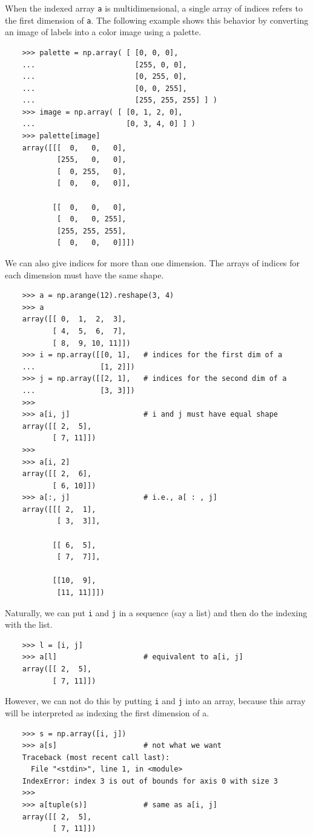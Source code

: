 \documentclass[UTF8]{article}
\begin{document}
When the indexed array \texttt{a} is multidimensional, a single array of indices refers to the
first dimension of \texttt{a}. The following example shows this behavior by converting an image of
labels into a color image using a palette.
\begin{verbatim}
    >>> palette = np.array( [ [0, 0, 0],
    ...                       [255, 0, 0],
    ...                       [0, 255, 0],
    ...                       [0, 0, 255],
    ...                       [255, 255, 255] ] )
    >>> image = np.array( [ [0, 1, 2, 0],
    ...                     [0, 3, 4, 0] ] )
    >>> palette[image]
    array([[[  0,   0,   0],
            [255,   0,   0],
            [  0, 255,   0],
            [  0,   0,   0]],

           [[  0,   0,   0],
            [  0,   0, 255],
            [255, 255, 255],
            [  0,   0,   0]]])
\end{verbatim}

We can also give indices for more than one dimension. The arrays of indices for each dimension must
have the same shape.
\begin{verbatim}
    >>> a = np.arange(12).reshape(3, 4)
    >>> a
    array([[ 0,  1,  2,  3],
           [ 4,  5,  6,  7],
           [ 8,  9, 10, 11]])
    >>> i = np.array([[0, 1],   # indices for the first dim of a
    ...               [1, 2]])
    >>> j = np.array([[2, 1],   # indices for the second dim of a
    ...               [3, 3]])
    >>>
    >>> a[i, j]                 # i and j must have equal shape
    array([[ 2,  5],
           [ 7, 11]])
    >>>
    >>> a[i, 2]
    array([[ 2,  6],
           [ 6, 10]])
    >>> a[:, j]                 # i.e., a[ : , j]
    array([[[ 2,  1],
            [ 3,  3]],

           [[ 6,  5],
            [ 7,  7]],

           [[10,  9],
            [11, 11]]])
\end{verbatim}

Naturally, we can put \texttt{i} and \texttt{j} in a sequence (say a list) and then do the indexing
with the list.
\begin{verbatim}
    >>> l = [i, j]
    >>> a[l]                    # equivalent to a[i, j]
    array([[ 2,  5],
           [ 7, 11]])
\end{verbatim}

However, we can not do this by putting \texttt{i} and \texttt{j} into an array, because this array
will be interpreted as indexing the first dimension of a.
\begin{verbatim}
    >>> s = np.array([i, j])
    >>> a[s]                    # not what we want
    Traceback (most recent call last):
      File "<stdin>", line 1, in <module>
    IndexError: index 3 is out of bounds for axis 0 with size 3
    >>>
    >>> a[tuple(s)]             # same as a[i, j]
    array([[ 2,  5],
           [ 7, 11]])
\end{verbatim}
\end{document}
